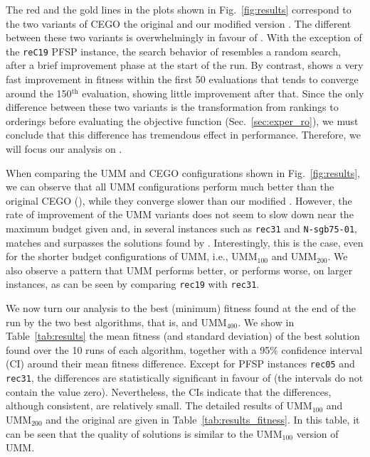 \documentclass[sigconf,dvipsnames]{acmart}
\begin{document}
The red and the gold lines in the plots shown in Fig.~\ref{fig:results}
correspond to the two variants of CEGO the original \CEGOorig and our modified
version \CEGOinv. The different between these two variants is overwhelmingly in
favour of \CEGOinv. With the exception of the \texttt{reC19} PFSP instance, the
search behavior of \CEGOorig resembles a random search, after a brief
improvement phase at the start of the run. By contrast, \CEGOinv shows a very
fast improvement in fitness within the first 50 evaluations that tends to
converge around the 150$^\text{th}$ evaluation, showing little improvement
after that. Since the only difference between these two variants is the
transformation from rankings to orderings before evaluating the objective
function (Sec.~\ref{sec:exper_ro}), we must conclude that this difference has
tremendous effect in performance. Therefore, we will focus our analysis on
\CEGOinv.

When comparing the UMM and CEGO configurations shown in Fig.~\ref{fig:results},
we can observe that all UMM configurations perform much better than the
original CEGO (\CEGOorig), while they converge slower than our modified
\CEGOinv. However, the rate of improvement of the UMM variants does not seem to
slow down near the maximum budget given and, in several instances such as
\texttt{rec31} and \texttt{N-sgb75-01}, matches and surpasses the solutions
found by \CEGOinv. Interestingly, this is the case, even for the shorter budget
configurations of UMM, i.e., UMM$_{100}$ and UMM$_{200}$. We also observe a
pattern that UMM performs better, or \CEGOinv performs worse, on larger
instances, as can be seen by comparing \texttt{rec19} with \texttt{rec31}.

%
We now turn our analysis to the best (minimum) fitness found at the end of the
run by the two best algorithms, that is, \CEGOinv and UMM$_{400}$. We show in
Table~\ref{tab:results} the mean fitness (and standard deviation) of the best
solution found over the 10 runs of each algorithm, together with a 95\%
confidence interval (CI) around their mean fitness difference. 
Except for PFSP
instances \texttt{rec05} and \texttt{rec31}, the differences are statistically
significant in favour of \CEGOinv (the intervals do not contain the value
zero). Nevertheless, the CIs indicate that the differences, although
consistent, are relatively small.
The detailed results of UMM$_{100}$  and UMM$_{200}$  and the original \CEGOorig are given in Table~\ref{tab:results_fitness}. In this table, it can be seen that the quality of \CEGOorig  solutions is similar to the UMM$_{100}$ version of UMM. 
\end{document}
